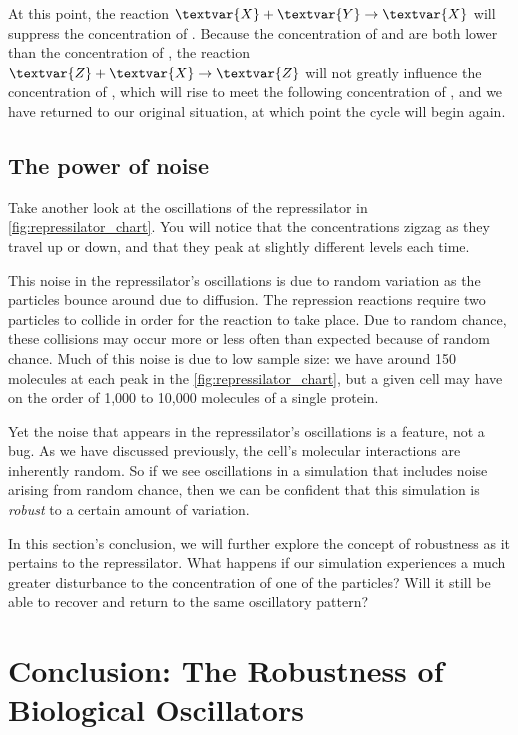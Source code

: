At this point, the reaction $\textvar{X} + \textvar{Y} \rightarrow \textvar{X}$ will suppress the concentration of . Because the concentration of  and  are both lower than the concentration of , the reaction $\textvar{Z} + \textvar{X} \rightarrow \textvar{Z}$ will not greatly influence the concentration of , which will rise to meet the following concentration of , and we have returned to our original situation, at which point the cycle will begin again.

\FloatBarrier
{}
\subsection{The power of noise}

Take another look at the oscillations of the repressilator in \autoref{fig:repressilator_chart}. You will notice that the concentrations zigzag as they travel up or down, and that they peak at slightly different levels each time.

This noise in the repressilator's oscillations is due to random variation as the particles bounce around due to diffusion. The repression reactions require two particles to collide in order for the reaction to take place. Due to random chance, these collisions may occur more or less often than expected because of random chance. Much of this noise is due to low sample size: we have around 150 molecules at each peak in the \autoref{fig:repressilator_chart}, but a given cell may have on the order of 1,000 to 10,000 molecules of a single protein.

Yet the noise that appears in the repressilator's oscillations is a feature, not a bug. As we have discussed previously, the cell's molecular interactions are inherently random. So if we see oscillations in a simulation that includes noise arising from random chance, then we can be confident that this simulation is \textit{robust} to a certain amount of variation.

In this section's conclusion, we will further explore the concept of robustness as it pertains to the repressilator. What happens if our simulation experiences a much greater disturbance to the concentration of one of the particles?  Will it still be able to recover and return to the same oscillatory pattern?\\

\FloatBarrier
{}

\section{Conclusion: The Robustness of Biological Oscillators}
\label{sec:biological_oscillators_must_be_robust}

